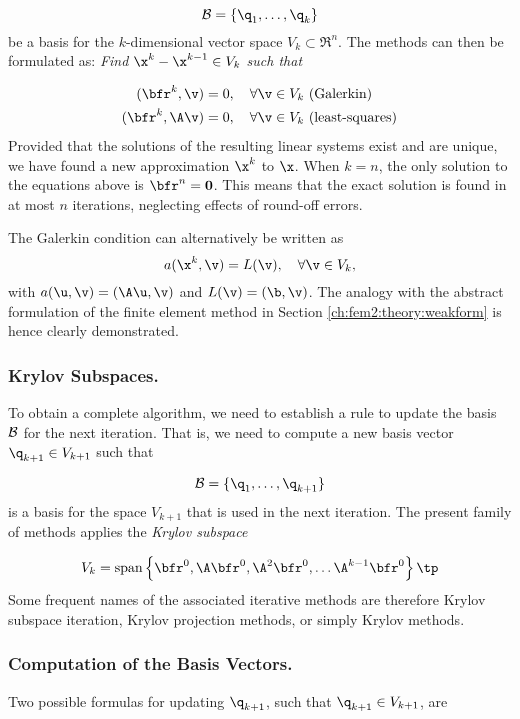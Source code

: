\[ \mathcal{B}=\{\q_1,\ldots,\q_k \} \]
be a basis for the $k$-dimensional vector space $V_k\subset\Re^n$.
The methods can then be formulated as: \emph{Find $\x^k-\x^{k-1}\in
V_k$ such that}

\begin{align*}
 (\bfr^k,\v )&= 0,\quad\forall\v\in V_k\hbox{  (Galerkin)}\\
 (\bfr^k,\A\v ) &= 0,\quad\forall\v\in V_k\hbox{  (least-squares)}
\end{align*}
Provided that the solutions of the resulting linear systems exist and are
unique, we have found a new approximation $\x^k$ to $\x$.
When $k=n$, the only solution to the equations above is $\bfr^n={\bf 0}$.
This means that the exact solution is found in at most $n$ iterations,
neglecting effects of round-off errors.

The Galerkin condition can alternatively be written as
\[ a(\x^k,\v) = L(\v ),\quad\forall\v\in V_k, \]
with $a(\u,\v) = (\A\u,\v )$ and $L(\v) = (\b,\v )$.
The analogy with the abstract formulation of the finite element method in
Section \ref{ch:fem2:theory:weakform} is hence clearly demonstrated.

\subsubsection{Krylov Subspaces.}
To obtain a complete algorithm, we need to establish a rule to update
the basis $\cal B$ for the next iteration. That is, we need to
compute a new basis vector $\q_{k+1}\in V_{k+1}$ such that

\begin{equation}
\mathcal{B} =\{ \q_1,\ldots,\q_{k+1}\}
\label{linalg2:cg:Basis}
\end{equation}
is a basis for the space $V_{k+1}$ that is used in the next iteration.
The present family of methods applies the \emph{Krylov subspace}

\begin{equation}
V_k = \mbox{span} \left\lbrace \bfr^0,\A\bfr^0,\A^2\bfr^0,\ldots
\A^{k-1}\bfr^0 \right\rbrace \tp
\end{equation}
Some frequent names
of the associated iterative methods are therefore
{Krylov subspace iteration}, Krylov projection methods,
or simply Krylov methods.

\subsubsection{Computation of the Basis Vectors.}
Two possible formulas for updating $\q_{k+1}$, such that
$\q_{k+1}\in V_{k+1}$, are

